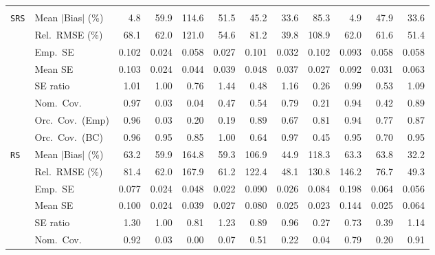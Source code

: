 \begin{landscape}
\begin{longtable}{llrrrrrrrrrr}
\addlinespace[2pt]
\multicolumn{12}{l}{\textbf{Interaction}} \\
\addlinespace[2pt]
\quad \texttt{SRS} & Mean $|$Bias$|$ (\%) & \cellcolor{rankone}4.8 & 59.9 & 114.6 & 51.5 & 45.2 & 33.6 & 85.3 & \cellcolor{ranktwo}4.9 & 47.9 & \cellcolor{rankthree}33.6 \\
 & Rel.\ RMSE (\%) & 68.1 & 62.0 & 121.0 & \cellcolor{rankthree}54.6 & 81.2 & \cellcolor{rankone}39.8 & 108.9 & 62.0 & 61.6 & \cellcolor{ranktwo}51.4 \\
 & Emp.\ SE & 0.102 & 0.024 & 0.058 & 0.027 & 0.101 & 0.032 & 0.102 & 0.093 & 0.058 & 0.058 \\
 & Mean SE & 0.103 & 0.024 & 0.044 & 0.039 & 0.048 & 0.037 & 0.027 & 0.092 & 0.031 & 0.063 \\
 & SE ratio & \cellcolor{ranktwo}1.01 & \cellcolor{rankone}1.00 & 0.76 & 1.44 & 0.48 & 1.16 & 0.26 & \cellcolor{rankthree}0.99 & 0.53 & 1.09 \\
 & Nom.\ Cov. & \cellcolor{ranktwo}0.97 & 0.03 & 0.04 & 0.47 & 0.54 & 0.79 & 0.21 & \cellcolor{rankone}0.94 & 0.42 & \cellcolor{rankthree}0.89 \\
 & Orc.\ Cov.\ (Emp) & \cellcolor{ranktwo}0.96 & 0.03 & 0.20 & 0.19 & \cellcolor{rankthree}0.89 & 0.67 & 0.81 & \cellcolor{rankone}0.94 & 0.77 & 0.87 \\
 & Orc.\ Cov.\ (BC) & 0.96 & \cellcolor{rankone}0.95 & 0.85 & 1.00 & 0.64 & 0.97 & 0.45 & \cellcolor{ranktwo}0.95 & 0.70 & \cellcolor{rankthree}0.95 \\
\addlinespace[2pt]
\quad \texttt{RS} & Mean $|$Bias$|$ (\%) & 63.2 & 59.9 & 164.8 & \cellcolor{rankthree}59.3 & 106.9 & \cellcolor{ranktwo}44.9 & 118.3 & 63.3 & 63.8 & \cellcolor{rankone}32.2 \\
 & Rel.\ RMSE (\%) & 81.4 & 62.0 & 167.9 & \cellcolor{rankthree}61.2 & 122.4 & \cellcolor{rankone}48.1 & 130.8 & 146.2 & 76.7 & \cellcolor{ranktwo}49.3 \\
 & Emp.\ SE & 0.077 & 0.024 & 0.048 & 0.022 & 0.090 & 0.026 & 0.084 & 0.198 & 0.064 & 0.056 \\
 & Mean SE & 0.100 & 0.024 & 0.039 & 0.027 & 0.080 & 0.025 & 0.023 & 0.144 & 0.025 & 0.064 \\
 & SE ratio & 1.30 & \cellcolor{rankone}1.00 & 0.81 & 1.23 & \cellcolor{rankthree}0.89 & \cellcolor{ranktwo}0.96 & 0.27 & 0.73 & 0.39 & 1.14 \\
 & Nom.\ Cov. & \cellcolor{rankone}0.92 & 0.03 & 0.00 & 0.07 & 0.51 & 0.22 & 0.04 & \cellcolor{rankthree}0.79 & 0.20 & \cellcolor{ranktwo}0.91 \\

\end{longtable}
\end{landscape}
